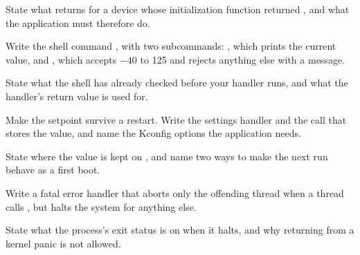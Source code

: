 State what  returns for a device whose initialization function returned
, and what the application must therefore do. 

\label{exb:q:8}

 Write the shell command , with two subcommands: , which
prints the current value, and , which accepts $-40$ to 125 and rejects
anything else with a message.

State what the shell has already checked before your  handler runs, and what the handler's
return value is used for. 

 Make the setpoint survive a restart. Write the settings handler and the call that stores
the value, and name the Kconfig options the application needs.

State where the value is kept on , and name two ways to make the next run behave as
a first boot. 

 Write a fatal error handler that aborts only the offending thread when a thread calls
, but halts the system for anything else.

State what the process's exit status is on  when it halts, and why returning from a
kernel panic is not allowed. 

